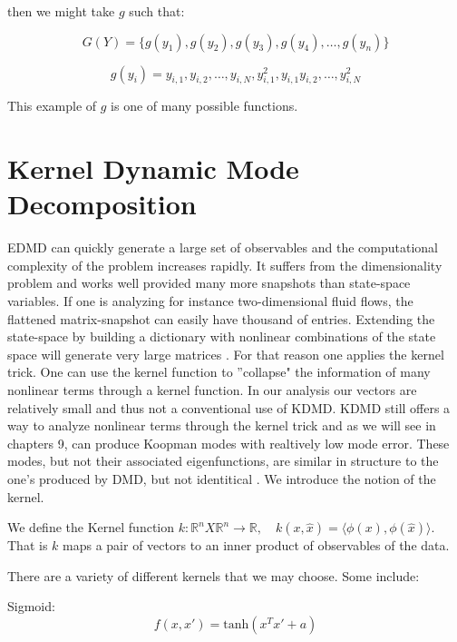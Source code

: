 \noindent then we might take $g$ such that:

$$
G(Y) = \{g(y_1), g(y_2), g(y_3), g(y_4), \dots , g(y_n)\}
$$

$$
g(y_i) = {y_{i,1}, y_{i,2},\dots, y_{i,N}, y^{2}_{i,1}, y_{i,1}y_{i,2}, \dots, y^{2}_{i,N}} 
$$

\noindent This example of $g$ is one of many possible functions.

\section{Kernel Dynamic Mode Decomposition}

EDMD can quickly generate a large set of observables
 and the computational complexity of the problem increases rapidly. It suffers from the
 dimensionality problem and works well provided many more snapshots than state-space
variables. If one is analyzing for instance two-dimensional fluid flows, the flattened matrix-snapshot
can easily have thousand of entries. Extending the state-space by building a dictionary with nonlinear combinations of the 
state space will generate very large matrices \cite{williams2015kernelbased}. For that reason one applies the kernel trick. One can use the kernel function
to ''collapse" the information of many nonlinear terms through a kernel function. In our analysis our vectors are relatively small and thus not a conventional use of KDMD. 
 KDMD still offers a way to analyze nonlinear terms through the kernel trick and as we will see in chapters 9, can produce 
 Koopman modes with realtively low mode error. 
 These modes, but not their associated eigenfunctions, are similar in structure to the one's produced by DMD, but not identitical \cite{doi:10.1137/1.9781611974508}. 
We introduce the notion of the kernel.

\begin{dfn}
    We define the Kernel function $k:\mathbb{R}^n X \mathbb{R}^n \rightarrow \mathbb{R}, \quad k(x,{\hat x}) = \langle \phi(x), \phi({\hat x})\rangle$.
     That is $k$ maps a pair of vectors to an inner product of observables of the data.
\end{dfn}

\noindent There are a variety of different kernels that we may choose. Some include:

\vspace{3mm}

\noindent Sigmoid:
$$
f(x,x') = \text{tanh}(x^Tx' + a)
$$

\vspace{3mm}

